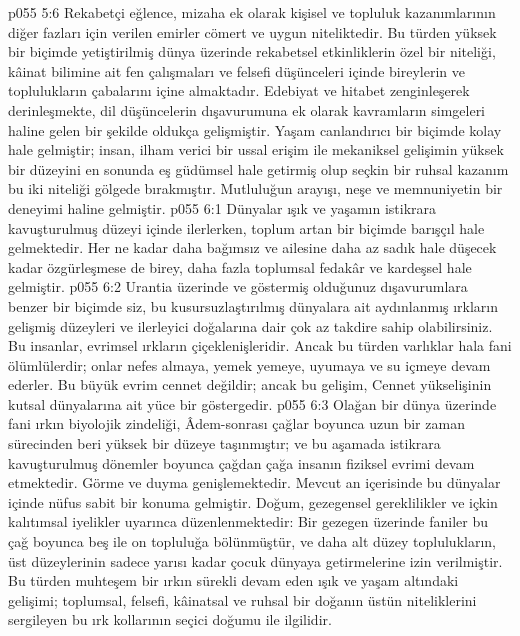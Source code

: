 \vs p055 5:6 Rekabetçi eğlence, mizaha ek olarak kişisel ve topluluk kazanımlarının diğer fazları için verilen emirler cömert ve uygun niteliktedir. Bu türden yüksek bir biçimde yetiştirilmiş dünya üzerinde rekabetsel etkinliklerin özel bir niteliği, kâinat bilimine ait fen çalışmaları ve felsefi düşünceleri içinde bireylerin ve toplulukların çabalarını içine almaktadır. Edebiyat ve hitabet zenginleşerek derinleşmekte, dil düşüncelerin dışavurumuna ek olarak kavramların simgeleri haline gelen bir şekilde oldukça gelişmiştir. Yaşam canlandırıcı bir biçimde kolay hale gelmiştir; insan, ilham verici bir ussal erişim ile mekaniksel gelişimin yüksek bir düzeyini en sonunda eş güdümsel hale getirmiş olup seçkin bir ruhsal kazanım bu iki niteliği gölgede bırakmıştır. Mutluluğun arayışı, neşe ve memnuniyetin bir deneyimi haline gelmiştir.
\vs p055 6:1 Dünyalar ışık ve yaşamın istikrara kavuşturulmuş düzeyi içinde ilerlerken, toplum artan bir biçimde barışçıl hale gelmektedir. Her ne kadar daha bağımsız ve ailesine daha az sadık hale düşecek kadar özgürleşmese de birey, daha fazla toplumsal fedakâr ve kardeşsel hale gelmiştir.
\vs p055 6:2 Urantia üzerinde ve göstermiş olduğunuz dışavurumlara benzer bir biçimde siz, bu kusursuzlaştırılmış dünyalara ait aydınlanmış ırkların gelişmiş düzeyleri ve ilerleyici doğalarına dair çok az takdire sahip olabilirsiniz. Bu insanlar, evrimsel ırkların çiçeklenişleridir. Ancak bu türden varlıklar hala fani ölümlülerdir; onlar nefes almaya, yemek yemeye, uyumaya ve su içmeye devam ederler. Bu büyük evrim cennet değildir; ancak bu gelişim, Cennet yükselişinin kutsal dünyalarına ait yüce bir göstergedir.
\vs p055 6:3 Olağan bir dünya üzerinde fani ırkın biyolojik zindeliği, Âdem\hyp{}sonrası çağlar boyunca uzun bir zaman sürecinden beri yüksek bir düzeye taşınmıştır; ve bu aşamada istikrara kavuşturulmuş dönemler boyunca çağdan çağa insanın fiziksel evrimi devam etmektedir. Görme ve duyma genişlemektedir. Mevcut an içerisinde bu dünyalar içinde nüfus sabit bir konuma gelmiştir. Doğum, gezegensel gereklilikler ve içkin kalıtımsal iyelikler uyarınca düzenlenmektedir: Bir gezegen üzerinde faniler bu çağ boyunca beş ile on topluluğa bölünmüştür, ve daha alt düzey toplulukların, üst düzeylerinin sadece yarısı kadar çocuk dünyaya getirmelerine izin verilmiştir. Bu türden muhteşem bir ırkın sürekli devam eden ışık ve yaşam altındaki gelişimi; toplumsal, felsefi, kâinatsal ve ruhsal bir doğanın üstün niteliklerini sergileyen bu ırk kollarının seçici doğumu ile ilgilidir.
